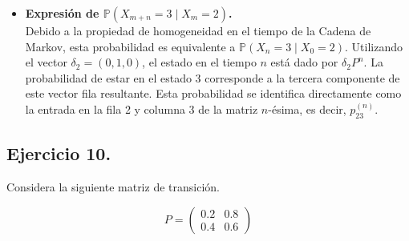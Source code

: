 \documentclass[10pt,a4paper]{book}
\begin{document}
\begin{itemize}
    \item[\textbf{f)}] \textbf{Expresión de $\mathbb{P}(X_{m+n} = 3 \mid X_m = 2)$.} \\
    Debido a la propiedad de homogeneidad en el tiempo de la Cadena de Markov, esta probabilidad es equivalente a $\mathbb{P}(X_n = 3 \mid X_0 = 2)$. 
    Utilizando el vector $\delta_2 = (0, 1, 0)$, el estado en el tiempo $n$ está dado por $\delta_2 P^n$. La probabilidad de estar en el estado 3 corresponde a la tercera componente de este vector fila resultante.
    Esta probabilidad se identifica directamente como la entrada en la fila 2 y columna 3 de la matriz $n$-ésima, es decir, $p_{23}^{(n)}$.
\end{itemize}

\newpage

\subsection{Ejercicio 10.} Considera la siguiente matriz de transición.

\vspace{0.2cm}

    \[ P = \begin{pmatrix} 
    0.2 & 0.8 \\ 
    0.4 & 0.6 
    \end{pmatrix} \]
    
\vspace{0.2cm}
\end{document}
